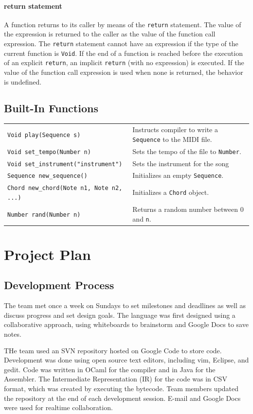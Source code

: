 \documentclass[12pt,A4]{book}
\begin{document}
\subsubsection{return statement}
A function returns to its caller by means of the \verb|return| statement. The value of the expression is returned to the caller as the value of the function call expression. The \verb|return| statement cannot have an expression if the type of the current function is \verb|Void|.
If the end of a function is reached before the execution of an explicit \verb|return|, an implicit \verb|return| (with no expression) is executed. If the value of the function call expression is used when none is returned, the behavior is undefined.

\section{Built-In Functions}

\begin{tabular}{l p{}}
\verb|Void play(Sequence s)| & Instructs compiler to write a \verb|Sequence| to the MIDI file.\\
\verb|Void set_tempo(Number n)| & Sets the tempo of the file to \verb|Number|.\\
\verb|Void set_instrument("instrument")| & Sets the instrument for the song\\
\verb|Sequence new_sequence()| & Initializes an empty \verb|Sequence|.\\
\verb|Chord new_chord(Note n1, Note n2, ...)| & Initializes a \verb|Chord| object.\\
\verb|Number rand(Number n)| & Returns a random number between 0 and \verb|n|.\\
\end{tabular}

\chapter{Project Plan}
\section{Development Process}
The team met once a week on Sundays to set milestones and deadlines as well as discuss progress and set design goals. The language was first designed using a collaborative approach, using whiteboards to brainstorm and Google Docs to save notes.

THe team used an SVN repository hosted on Google Code to store code. Development was done using open source text editors, including vim, Eclipse, and gedit. Code was written in OCaml for the compiler and in Java for the Assembler. The Intermediate Representation (IR) for the code was in CSV format, which was created by executing the bytecode. Team members updated the repository at the end of each development session. E-mail and Google Docs were used for realtime collaboration.
\end{document}
